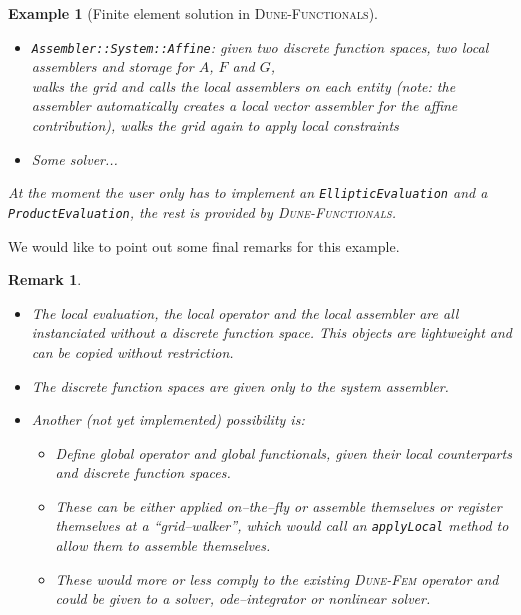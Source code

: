 \documentclass[a4paper,11pt]{article}
\numberwithin{equation}{section}
\newtheorem{remark}[definition]{Remark}
\newtheorem{example}[definition]{Example}
\newcommand{\theoremNewline}{\hspace{1mm}\\}
\newcommand{\theoremEndLine}{\hspace{1mm}}
\newcommand{\CodeT}[1]{\textnormal{\texttt{#1}}}
\newcommand{\dunefem}{\textsc{Dune-Fem}\xspace}
\newcommand{\dunefunctionals}{\textsc{Dune-Functionals}\xspace}
\begin{document}
\begin{example}[Finite element solution in \dunefunctionals]
\begin{itemize}
		\item \CodeT{Assembler::System::Affine}: given two discrete function spaces, two local assemblers and storage for
			$A$, $F$ and $G$,\\
			walks the grid and calls the local assemblers on each entity (note: the assembler automatically creates a local
			vector assembler for the affine contribution),
			walks the grid again to apply local constraints\\
		\item Some solver...
	\end{itemize}
	At the moment the user only has to implement an \CodeT{EllipticEvaluation} and a \CodeT{ProductEvaluation}, the rest is
	provided by \dunefunctionals.  
\end{example}\theoremEndLine

We would like to point out some final remarks for this example.

\begin{remark}\theoremNewline
  \label{remarks::discretization::final_remarks_fem}
  \begin{itemize}
    \item The local evaluation, the local operator and the local assembler are all instanciated without a discrete
			function space. This objects are lightweight and can be copied without restriction.
		\item The discrete function spaces are given only to the system assembler.
		\item Another (not yet implemented) possibility is:
			\begin{itemize}
				\item Define global operator and global functionals, given their local counterparts and discrete function
					spaces.
				\item These can be either applied on--the--fly or assemble themselves or register themselves at a
					``grid--walker'', which would call an \CodeT{applyLocal} method to allow them to assemble themselves.
				\item These would more or less comply to the existing \dunefem operator and could be given to a solver,
					ode--integrator or nonlinear solver.
			\end{itemize}
	\end{itemize}
\end{remark}\theoremEndLine
  
%   
%   
\end{document}

